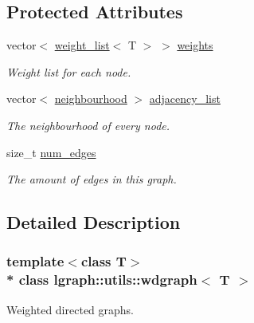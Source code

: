 \subsection*{Protected Attributes}
\begin{DoxyCompactItemize}
\item 
vector$<$ \hyperlink{namespacelgraph_1_1utils_a11e7963f3637ea13778b8d3e69d2c17f}{weight\+\_\+list}$<$ T $>$ $>$ \hyperlink{classlgraph_1_1utils_1_1wxgraph_a15569c8c0fccb641709dc81eb0e29c94}{weights}
\begin{DoxyCompactList}\small\item\em Weight list for each node. \end{DoxyCompactList}\item 
vector$<$ \hyperlink{namespacelgraph_1_1utils_a0f2ef47028a466d26841709e705390ac}{neighbourhood} $>$ \hyperlink{classlgraph_1_1utils_1_1xxgraph_a1d5fda0d5aa89340f997428b982f966f}{adjacency\+\_\+list}\hypertarget{classlgraph_1_1utils_1_1xxgraph_a1d5fda0d5aa89340f997428b982f966f}{}\label{classlgraph_1_1utils_1_1xxgraph_a1d5fda0d5aa89340f997428b982f966f}

\begin{DoxyCompactList}\small\item\em The neighbourhood of every node. \end{DoxyCompactList}\item 
size\+\_\+t \hyperlink{classlgraph_1_1utils_1_1xxgraph_a217ebb1cd8946fedfbf94a9b22f7da48}{num\+\_\+edges}\hypertarget{classlgraph_1_1utils_1_1xxgraph_a217ebb1cd8946fedfbf94a9b22f7da48}{}\label{classlgraph_1_1utils_1_1xxgraph_a217ebb1cd8946fedfbf94a9b22f7da48}

\begin{DoxyCompactList}\small\item\em The amount of edges in this graph. \end{DoxyCompactList}\end{DoxyCompactItemize}


\subsection{Detailed Description}
\subsubsection*{template$<$class T$>$\\*
class lgraph\+::utils\+::wdgraph$<$ T $>$}

Weighted directed graphs. 

